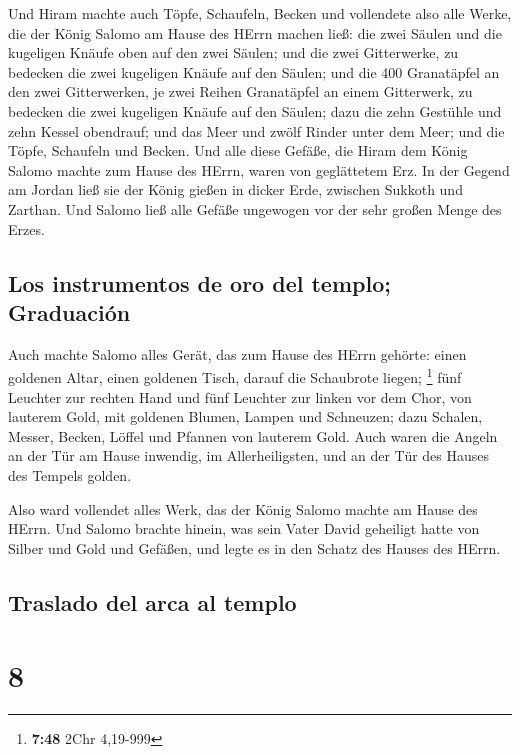  Und Hiram machte auch Töpfe, Schaufeln, Becken und
vollendete also alle Werke, die der König Salomo am Hause des HErrn
machen ließ:  die zwei Säulen und die kugeligen Knäufe
oben auf den zwei Säulen; und die zwei Gitterwerke, zu bedecken die zwei
kugeligen Knäufe auf den Säulen;  und die 400 Granatäpfel
an den zwei Gitterwerken, je zwei Reihen Granatäpfel an einem
Gitterwerk, zu bedecken die zwei kugeligen Knäufe auf den Säulen;
 dazu die zehn Gestühle und zehn Kessel obendrauf;
 und das Meer und zwölf Rinder unter dem Meer;
 und die Töpfe, Schaufeln und Becken. Und alle diese
Gefäße, die Hiram dem König Salomo machte zum Hause des HErrn, waren von
geglättetem Erz.  In der Gegend am Jordan ließ sie der
König gießen in dicker Erde, zwischen Sukkoth und Zarthan.
 Und Salomo ließ alle Gefäße ungewogen vor der sehr
großen Menge des Erzes.

\hypertarget{los-instrumentos-de-oro-del-templo-graduaciuxf3n}{%
\subsection{Los instrumentos de oro del templo;
Graduación}\label{los-instrumentos-de-oro-del-templo-graduaciuxf3n}}

 Auch machte Salomo alles Gerät, das zum Hause des HErrn
gehörte: einen goldenen Altar, einen goldenen Tisch, darauf die
Schaubrote liegen; \footnote{\textbf{7:48} 2Chr 4,19-999}
 fünf Leuchter zur rechten Hand und fünf Leuchter zur
linken vor dem Chor, von lauterem Gold, mit goldenen Blumen, Lampen und
Schneuzen;  dazu Schalen, Messer, Becken, Löffel und
Pfannen von lauterem Gold. Auch waren die Angeln an der Tür am Hause
inwendig, im Allerheiligsten, und an der Tür des Hauses des Tempels
golden.

 Also ward vollendet alles Werk, das der König Salomo
machte am Hause des HErrn. Und Salomo brachte hinein, was sein Vater
David geheiligt hatte von Silber und Gold und Gefäßen, und legte es in
den Schatz des Hauses des HErrn.

\hypertarget{traslado-del-arca-al-templo}{%
\subsection{Traslado del arca al
templo}\label{traslado-del-arca-al-templo}}

\hypertarget{section-7}{%
\section{8}\label{section-7}}

